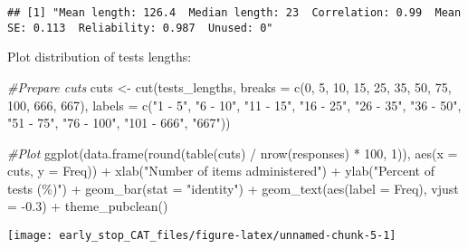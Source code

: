\documentclass[
]{article}
\newenvironment{Shaded}{\begin{snugshade}}{\end{snugshade}}
\newcommand{\AttributeTok}[1]{\textcolor[rgb]{0.77,0.63,0.00}{#1}}
\newcommand{\CommentTok}[1]{\textcolor[rgb]{0.56,0.35,0.01}{\textit{#1}}}
\newcommand{\DecValTok}[1]{\textcolor[rgb]{0.00,0.00,0.81}{#1}}
\newcommand{\FloatTok}[1]{\textcolor[rgb]{0.00,0.00,0.81}{#1}}
\newcommand{\FunctionTok}[1]{\textcolor[rgb]{0.00,0.00,0.00}{#1}}
\newcommand{\NormalTok}[1]{#1}
\newcommand{\OtherTok}[1]{\textcolor[rgb]{0.56,0.35,0.01}{#1}}
\newcommand{\SpecialCharTok}[1]{\textcolor[rgb]{0.00,0.00,0.00}{#1}}
\newcommand{\StringTok}[1]{\textcolor[rgb]{0.31,0.60,0.02}{#1}}
\begin{document}
\begin{verbatim}
## [1] "Mean length: 126.4  Median length: 23  Correlation: 0.99  Mean SE: 0.113  Reliability: 0.987  Unused: 0"
\end{verbatim}

Plot distribution of tests lengths:

\begin{Shaded}
\begin{Highlighting}[]
\CommentTok{\#Prepare cuts}
\NormalTok{cuts }\OtherTok{\textless{}{-}} \FunctionTok{cut}\NormalTok{(tests\_lengths, }\AttributeTok{breaks =} \FunctionTok{c}\NormalTok{(}\DecValTok{0}\NormalTok{, }\DecValTok{5}\NormalTok{, }\DecValTok{10}\NormalTok{, }\DecValTok{15}\NormalTok{, }\DecValTok{25}\NormalTok{, }\DecValTok{35}\NormalTok{, }\DecValTok{50}\NormalTok{, }\DecValTok{75}\NormalTok{, }\DecValTok{100}\NormalTok{, }\DecValTok{666}\NormalTok{, }\DecValTok{667}\NormalTok{), }\AttributeTok{labels =} \FunctionTok{c}\NormalTok{(}\StringTok{"1 {-} 5"}\NormalTok{, }\StringTok{"6 {-} 10"}\NormalTok{, }\StringTok{"11 {-} 15"}\NormalTok{, }\StringTok{"16 {-} 25"}\NormalTok{, }\StringTok{"26 {-} 35"}\NormalTok{, }\StringTok{"36 {-} 50"}\NormalTok{, }\StringTok{"51 {-} 75"}\NormalTok{, }\StringTok{"76 {-} 100"}\NormalTok{, }\StringTok{"101 {-} 666"}\NormalTok{, }\StringTok{"667"}\NormalTok{))}

\CommentTok{\#Plot}
\FunctionTok{ggplot}\NormalTok{(}\FunctionTok{data.frame}\NormalTok{(}\FunctionTok{round}\NormalTok{(}\FunctionTok{table}\NormalTok{(cuts) }\SpecialCharTok{/} \FunctionTok{nrow}\NormalTok{(responses) }\SpecialCharTok{*} \DecValTok{100}\NormalTok{, }\DecValTok{1}\NormalTok{)), }\FunctionTok{aes}\NormalTok{(}\AttributeTok{x =}\NormalTok{ cuts, }\AttributeTok{y =}\NormalTok{ Freq)) }\SpecialCharTok{+}
  \FunctionTok{xlab}\NormalTok{(}\StringTok{"Number of items administered"}\NormalTok{) }\SpecialCharTok{+}
  \FunctionTok{ylab}\NormalTok{(}\StringTok{"Percent of tests (\%)"}\NormalTok{) }\SpecialCharTok{+}
  \FunctionTok{geom\_bar}\NormalTok{(}\AttributeTok{stat =} \StringTok{"identity"}\NormalTok{) }\SpecialCharTok{+}
  \FunctionTok{geom\_text}\NormalTok{(}\FunctionTok{aes}\NormalTok{(}\AttributeTok{label =}\NormalTok{ Freq), }\AttributeTok{vjust =} \SpecialCharTok{{-}}\FloatTok{0.3}\NormalTok{) }\SpecialCharTok{+} 
  \FunctionTok{theme\_pubclean}\NormalTok{() }
\end{Highlighting}
\end{Shaded}

\begin{center}\texttt{[image: early\_stop\_CAT\_files/figure-latex/unnamed-chunk-5-1]} \end{center}
\end{document}
